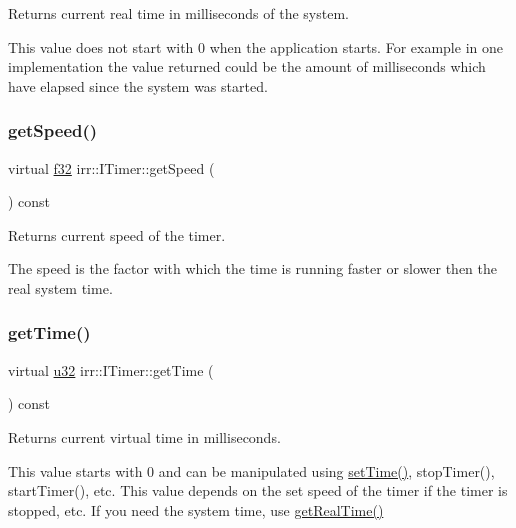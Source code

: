 Returns current real time in milliseconds of the system. 

This value does not start with 0 when the application starts. For example in one implementation the value returned could be the amount of milliseconds which have elapsed since the system was started. \mbox{\label{classirr_1_1ITimer_ac2b3c1947d78e5bb9dc62f32edc4e1b2}} 
\subsubsection{\texorpdfstring{get\+Speed()}{getSpeed()}}
{\footnotesize\ttfamily virtual \hyperlink{namespaceirr_a0277be98d67dc26ff93b1a6a1d086b07}{f32} irr\+::\+I\+Timer\+::get\+Speed (\begin{DoxyParamCaption}{ }\end{DoxyParamCaption}) const\hspace{0.3cm}{\ttfamily [pure virtual]}}



Returns current speed of the timer. 

The speed is the factor with which the time is running faster or slower then the real system time. \mbox{\label{classirr_1_1ITimer_aa2c53890268d6886b3b5bbf2af5dba9c}} 
\subsubsection{\texorpdfstring{get\+Time()}{getTime()}}
{\footnotesize\ttfamily virtual \hyperlink{namespaceirr_a0416a53257075833e7002efd0a18e804}{u32} irr\+::\+I\+Timer\+::get\+Time (\begin{DoxyParamCaption}{ }\end{DoxyParamCaption}) const\hspace{0.3cm}{\ttfamily [pure virtual]}}



Returns current virtual time in milliseconds. 

This value starts with 0 and can be manipulated using \hyperlink{classirr_1_1ITimer_ae93bf312ccf87478565e080450291386}{set\+Time()}, stop\+Timer(), start\+Timer(), etc. This value depends on the set speed of the timer if the timer is stopped, etc. If you need the system time, use \hyperlink{classirr_1_1ITimer_a67d6b3ae61c2e6aaad82c4ae15ab55f1}{get\+Real\+Time()} \mbox{\label{classirr_1_1ITimer_a13f3f4919a3431733bc90cd87d110675}} 
